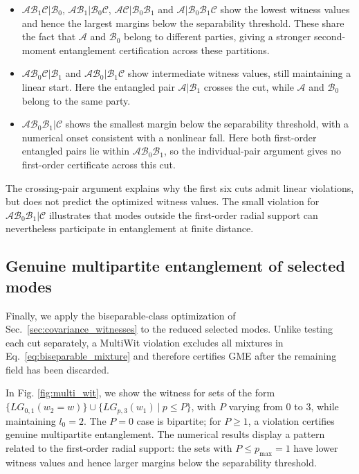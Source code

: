 \documentclass[%
 reprint,
 amsmath,amssymb,
 aps,
pra,
twocolumn,
]{revtex4-2}
\begin{document}
\begin{itemize}
    \item $\mathcal A\mathcal B_1\mathcal C|\mathcal B_0$, $\mathcal A\mathcal B_1|\mathcal B_0\mathcal C$, $\mathcal A\mathcal C|\mathcal B_0\mathcal B_1$ and $\mathcal A|\mathcal B_0\mathcal B_1\mathcal C$ show the lowest witness values and hence the largest margins below the separability threshold. These share the fact that $\mathcal A$ and $\mathcal B_0$ belong to different parties, giving a stronger second-moment entanglement certification across these partitions.
    \item $\mathcal A\mathcal B_0\mathcal C|\mathcal B_1$ and $\mathcal A\mathcal B_0|\mathcal B_1\mathcal C$ show intermediate witness values, still maintaining a linear start. Here the entangled pair $\mathcal A|\mathcal B_1$ crosses the cut, while $\mathcal A$ and $\mathcal B_0$ belong to the same party.
    \item $\mathcal A\mathcal B_0\mathcal B_1|\mathcal C$ shows the smallest margin below the separability threshold, with a numerical onset consistent with a nonlinear fall. Here both first-order entangled pairs lie within $\mathcal A\mathcal B_0\mathcal B_1$, so the individual-pair argument gives no first-order certificate across this cut.
\end{itemize}


The crossing-pair argument explains why the first six cuts admit linear violations, but does not predict the optimized witness values. The small violation for $\mathcal A\mathcal B_0\mathcal B_1|\mathcal C$ illustrates that modes outside the first-order radial support can nevertheless participate in entanglement at finite distance.

\subsection{Genuine multipartite entanglement of selected modes}

Finally, we apply the biseparable-class optimization of Sec.~\ref{sec:covariance_witnesses} to the reduced selected modes. Unlike testing each cut separately, a MultiWit violation excludes all mixtures in Eq.~\eqref{eq:biseparable_mixture} and therefore certifies GME after the remaining field has been discarded.



In Fig. \ref{fig:multi_wit}, we show the witness for sets of the form $\{LG_{0, 1}(w_2 = w)\} \cup \{LG_{p, 3}(w_1) \ \vert \ p \le P\}$, with $P$ varying from $0$ to $3$, while maintaining $l_0 = 2$. The $P=0$ case is bipartite; for $P\ge1$, a violation certifies genuine multipartite entanglement. The numerical results display a pattern related to the first-order radial support: the sets with $P \le p_{\text{max}} = 1$ have lower witness values and hence larger margins below the separability threshold.
\end{document}
